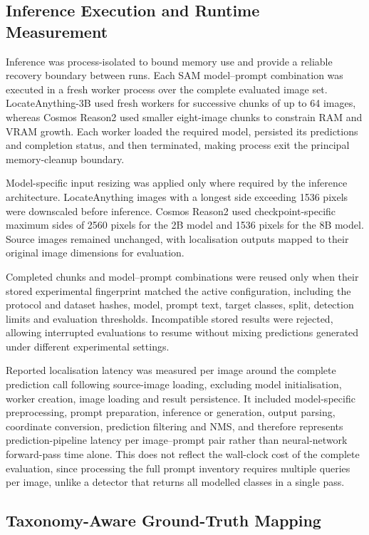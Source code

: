 \subsection{Inference Execution and Runtime Measurement}
\label{sec:inference-execution}
Inference was process-isolated to bound memory use and provide a reliable recovery boundary between runs. Each \gls{SAM} model--prompt combination was executed in a fresh worker process over the complete evaluated image set. LocateAnything-3B used fresh workers for successive chunks of up to 64 images, whereas Cosmos Reason2 used smaller eight-image chunks to constrain \gls{RAM} and \gls{VRAM} growth. Each worker loaded the required model, persisted its predictions and completion status, and then terminated, making process exit the principal memory-cleanup boundary.

Model-specific input resizing was applied only where required by the inference architecture. LocateAnything images with a longest side exceeding 1536 pixels were downscaled before inference. Cosmos Reason2 used checkpoint-specific maximum sides of 2560 pixels for the 2B model and 1536 pixels for the 8B model. Source images remained unchanged, with localisation outputs mapped to their original image dimensions for evaluation.

Completed chunks and model--prompt combinations were reused only when their stored experimental fingerprint matched the active configuration, including the protocol and dataset hashes, model, prompt text, target classes, split, detection limits and evaluation thresholds. Incompatible stored results were rejected, allowing interrupted evaluations to resume without mixing predictions generated under different experimental settings.

Reported localisation latency was measured per image around the complete prediction call following source-image loading, excluding model initialisation, worker creation, image loading and result persistence. It included model-specific preprocessing, prompt preparation, inference or generation, output parsing, coordinate conversion, prediction filtering and \gls{NMS}, and therefore represents prediction-pipeline latency per image--prompt pair rather than neural-network forward-pass time alone. This does not reflect the wall-clock cost of the complete evaluation, since processing the full prompt inventory requires multiple queries per image, unlike a detector that returns all modelled classes in a single pass.

\newpage
\subsection{Taxonomy-Aware Ground-Truth Mapping}
\label{sec:prompt-matching}

